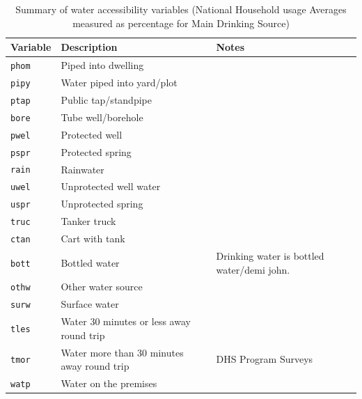 \documentclass[10pt,twoside]{article}
\numberwithin{equation}{section}
\newcommand{\?}{\stackrel{?}{=}}
\begin{document}
\begin{table}[h!]
  \centering
  \begin{tabular}{p{1in} p{3in} p{2in}}\toprule
    \bf Variable & \bf Description & \bf Notes \\\midrule
 \texttt{phom} & Piped into dwelling & 
 \\\midrule
 \texttt{pipy} & Water piped into yard/plot
& 
\\\midrule
    \texttt{ptap} &  Public tap/standpipe
 & 
 \\\midrule
 \texttt{bore} & Tube well/borehole & 
\\\midrule
\texttt{pwel} & Protected well
& 
\\\midrule
\texttt{pspr} & Protected spring
& 
\\\midrule

\texttt{rain} & Rainwater
& 
\\\midrule
\texttt{uwel} & Unprotected well water
&
\\\midrule
\texttt{uspr} & Unprotected spring
& 
\\\midrule

 \texttt{truc} & Tanker truck & 
\\\midrule
 \texttt{ctan} & Cart with tank & 
\\\midrule
 \texttt{bott} & Bottled water & Drinking water is bottled water/demi john.
\\\midrule
 \texttt{othw} & Other water source & 
\\\midrule
\texttt{surw} & Surface water
& 
\\\midrule
\texttt{tles} & Water 30 minutes or less away round trip
& 
\\\midrule 
\texttt{tmor} & Water more than 30 minutes away round trip & DHS Program Surveys
\\\midrule
 \texttt{watp} & Water on the premises
 & 
 \\\bottomrule
  \end{tabular}
  \caption{Summary of water accessibility variables (National Household usage Averages measured as percentage for Main Drinking Source)}
  \label{tab:summary-wa}
\end{table}
\end{document}
